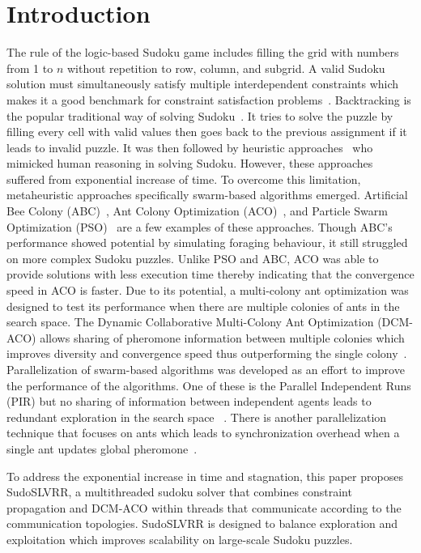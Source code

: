 \documentclass[runningheads]{llncs}
\begin{document}
\section{Introduction}
The rule of the logic-based Sudoku game includes filling the grid with numbers from 1 to $n$ without repetition to row, column, and subgrid. A valid Sudoku solution must simultaneously satisfy multiple interdependent constraints which makes it a good benchmark for constraint satisfaction problems~\cite{lloyd2020,simonis2005sudoku}. Backtracking is the popular traditional way of solving Sudoku~\cite{norvig2006solving,Schott,bhattarai2025study}. It tries to solve the puzzle by filling every cell with valid values then goes back to the previous assignment if it leads to invalid puzzle. It was then followed by heuristic approaches~\cite{crook2009pencil,bhattarai2025study} who mimicked human reasoning in solving Sudoku. However, these approaches suffered from exponential increase of time. To overcome this limitation, metaheuristic approaches specifically swarm-based algorithms emerged. Artificial Bee Colony (ABC)~\cite{pacurib2009}, Ant Colony Optimization (ACO)~\cite{lloyd2020}, and Particle Swarm Optimization (PSO)~\cite{PSO, GPSO} are a few examples of these approaches. Though ABC’s performance showed potential by simulating foraging behaviour, it still struggled on more complex Sudoku puzzles. Unlike PSO and ABC, ACO was able to provide solutions with less execution time thereby indicating that the convergence speed in ACO is faster. Due to its potential, a multi-colony ant optimization was designed to test its performance when there are multiple colonies of ants in the search space. The Dynamic Collaborative Multi-Colony Ant Optimization (DCM-ACO) allows sharing of pheromone information between multiple colonies which improves diversity and convergence speed thus outperforming the single colony~\cite{mo2022}. 
Parallelization of swarm-based algorithms was developed as an effort to improve the performance of the algorithms. One of these is the Parallel Independent Runs (PIR) but no sharing of information between independent agents leads to redundant exploration in the search space ~\cite{yang2015}. There is another parallelization technique that focuses on ants which leads to synchronization overhead when a single ant updates global pheromone~\cite{randall2002}. 

To address the exponential increase in time and stagnation, this paper proposes SudoSLVRR, a multithreaded sudoku solver that combines constraint propagation and DCM-ACO within threads that communicate according to the communication topologies. SudoSLVRR is designed to balance exploration and exploitation which improves scalability on large-scale Sudoku puzzles. 
%
\end{document}
